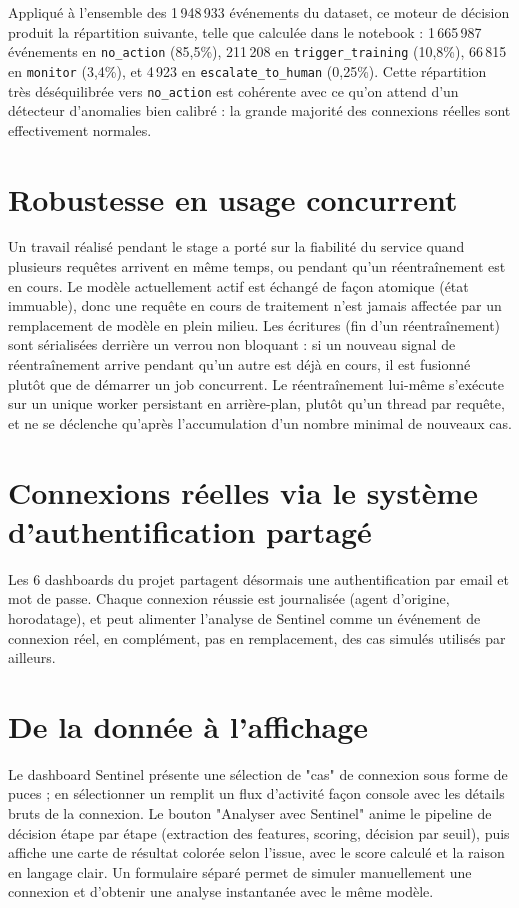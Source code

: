 \documentclass[12pt,a4paper]{report}
\begin{document}
Appliqué à l'ensemble des 1\,948\,933 événements du dataset, ce moteur de décision produit la répartition suivante, telle que calculée dans le notebook : 1\,665\,987 événements en \texttt{no\_action} (85,5\%), 211\,208 en \texttt{trigger\_training} (10,8\%), 66\,815 en \texttt{monitor} (3,4\%), et 4\,923 en \texttt{escalate\_to\_human} (0,25\%). Cette répartition très déséquilibrée vers \texttt{no\_action} est cohérente avec ce qu'on attend d'un détecteur d'anomalies bien calibré : la grande majorité des connexions réelles sont effectivement normales.

\section{Robustesse en usage concurrent}

Un travail réalisé pendant le stage a porté sur la fiabilité du service quand plusieurs requêtes arrivent en même temps, ou pendant qu'un réentraînement est en cours. Le modèle actuellement actif est échangé de façon atomique (état immuable), donc une requête en cours de traitement n'est jamais affectée par un remplacement de modèle en plein milieu. Les écritures (fin d'un réentraînement) sont sérialisées derrière un verrou non bloquant : si un nouveau signal de réentraînement arrive pendant qu'un autre est déjà en cours, il est fusionné plutôt que de démarrer un job concurrent. Le réentraînement lui-même s'exécute sur un unique worker persistant en arrière-plan, plutôt qu'un thread par requête, et ne se déclenche qu'après l'accumulation d'un nombre minimal de nouveaux cas.

\section{Connexions réelles via le système d'authentification partagé}

Les 6 dashboards du projet partagent désormais une authentification par email et mot de passe. Chaque connexion réussie est journalisée (agent d'origine, horodatage), et peut alimenter l'analyse de Sentinel comme un événement de connexion réel, en complément, pas en remplacement, des cas simulés utilisés par ailleurs.

\section{De la donnée à l'affichage}

Le dashboard Sentinel présente une sélection de "cas" de connexion sous forme de puces ; en sélectionner un remplit un flux d'activité façon console avec les détails bruts de la connexion. Le bouton "Analyser avec Sentinel" anime le pipeline de décision étape par étape (extraction des features, scoring, décision par seuil), puis affiche une carte de résultat colorée selon l'issue, avec le score calculé et la raison en langage clair. Un formulaire séparé permet de simuler manuellement une connexion et d'obtenir une analyse instantanée avec le même modèle.
\end{document}
